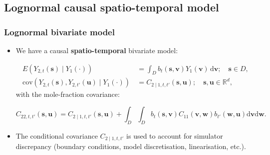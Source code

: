 \documentclass{beamer}
\newcommand{\s}{\mathbf{s}}
\renewcommand{\v}{\mathbf{v}}
\renewcommand{\u}{\mathbf{u}}
\newcommand{\w}{\mathbf{w}}
\renewcommand{\d}{\mathrm{d}}
\newcommand{\E}{E}
\newcommand{\cov}{\mathrm{cov}}
\begin{document}
\subsection{Lognormal causal spatio-temporal model}

\begin{frame}
\frametitle{Lognormal bivariate model}

\begin{itemize}

\item We have a causal {\bf spatio-temporal} bivariate model:

\begin{align*}
\E\left(Y_{2,t}(\s)\mid Y_1(\cdot)\right)&\,=\int_D{b_t(\s,\v)Y_1(\v)\,\d \v};\quad \s\in D,\\
\cov\left(Y_{2,t}(\s),Y_{2,t'}(\u)\mid Y_1(\cdot)\right)&\,=C_{2\mid 1,t,t'}(\s,\u);\quad \s,\u\in \mathbb{R}^d,
\end{align*}
with the mole-fraction covariance:

\begin{equation*}
C_{22,t,t'}(\s,\u) = C_{2\mid 1,t,t'}(\s,\u)+\int_D\int_D {b_t(\s,\v)} {C_{11}(\v,\w)} {b_{t'}(\w,\u)}\d\v\d\w.
\end{equation*}

\item The conditional covariance $C_{2\mid 1,t,t'}$ is used to account for simulator discrepancy (boundary conditions, model discretisation, linearisation, etc.).

\end{itemize}

\end{frame}
\end{document}
